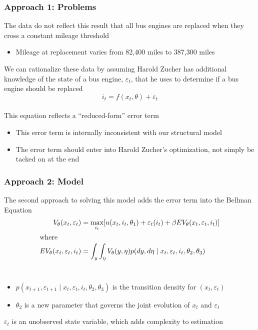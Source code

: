 \documentclass{beamer}
\begin{document}
\begin{frame}\frametitle{Approach 1: Problems}
    The data do not reflect this result that all bus engines are replaced when they cross a constant mileage threshold
    \begin{itemize}
    	\item Mileage at replacement varies from 82,400 miles to 387,300 miles
    \end{itemize}
    \vspace{2ex}
    We can rationalize these data by assuming Harold Zucher has additional knowledge of the state of a bus engine, $\varepsilon_t$, that he uses to determine if a bus engine should be replaced
    $$i_t = f(x_t, \theta) + \varepsilon_t$$ \\
    \vspace{2ex}
    This equation reflects a ``reduced-form'' error term
    \begin{itemize}
    	\item This error term is internally inconsistent with our structural model
    	\item The error term should enter into Harold Zucher's optimization, not simply be tacked on at the end
    \end{itemize}
\end{frame}

\begin{frame}\frametitle{Approach 2: Model}
    The second approach to solving this model adds the error term into the Bellman Equation
    \begin{align*}
    	V_{\theta}(x_t, \varepsilon_t) &= \max_{i_t} [u(x_t, i_t, \theta_1) + \varepsilon_t(i_t) + \beta EV_{\theta}(x_t, \varepsilon_t, i_t)] \\
    	\intertext{where}
    	EV_{\theta}(x_t, \varepsilon_t, i_t) &= \int_y \int_\eta V_{\theta}(y, \eta) p(dy, d \eta \mid x_t, \varepsilon_t, i_t, \theta_2, \theta_3)
    \end{align*} \\
    \begin{itemize}
    	\item $p(x_{t+1}, \varepsilon_{t+1} \mid x_t, \varepsilon_t, i_t, \theta_2, \theta_3)$ is the transition density for $(x_t, \varepsilon_t)$
    	\item $\theta_2$ is a new parameter that governs the joint evolution of $x_t$ and $\varepsilon_t$
    \end{itemize}
    \vspace{2ex}
    $\varepsilon_t$ is an unobserved state variable, which adds complexity to estimation
\end{frame}
\end{document}
